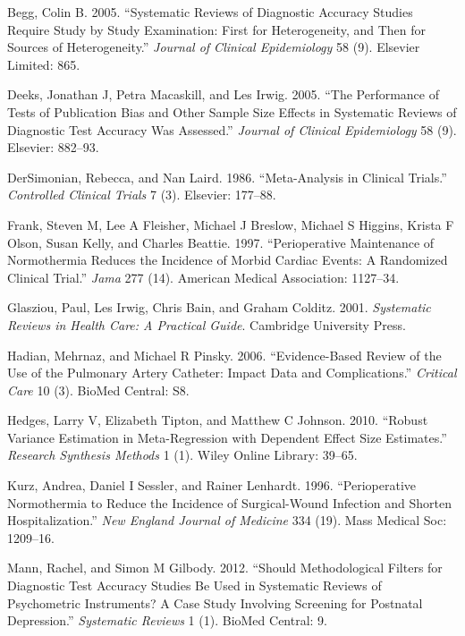 \documentclass[smallextended]{svjour3}       %
\begin{document}
\hypertarget{refs}{}
\leavevmode\hypertarget{ref-begg2005systematic}{}%
Begg, Colin B. 2005. ``Systematic Reviews of Diagnostic Accuracy Studies
Require Study by Study Examination: First for Heterogeneity, and Then
for Sources of Heterogeneity.'' \emph{Journal of Clinical Epidemiology}
58 (9). Elsevier Limited: 865.

\leavevmode\hypertarget{ref-deeks2005performance}{}%
Deeks, Jonathan J, Petra Macaskill, and Les Irwig. 2005. ``The
Performance of Tests of Publication Bias and Other Sample Size Effects
in Systematic Reviews of Diagnostic Test Accuracy Was Assessed.''
\emph{Journal of Clinical Epidemiology} 58 (9). Elsevier: 882--93.

\leavevmode\hypertarget{ref-dersimonian1986meta}{}%
DerSimonian, Rebecca, and Nan Laird. 1986. ``Meta-Analysis in Clinical
Trials.'' \emph{Controlled Clinical Trials} 7 (3). Elsevier: 177--88.

\leavevmode\hypertarget{ref-frank1997perioperative}{}%
Frank, Steven M, Lee A Fleisher, Michael J Breslow, Michael S Higgins,
Krista F Olson, Susan Kelly, and Charles Beattie. 1997. ``Perioperative
Maintenance of Normothermia Reduces the Incidence of Morbid Cardiac
Events: A Randomized Clinical Trial.'' \emph{Jama} 277 (14). American
Medical Association: 1127--34.

\leavevmode\hypertarget{ref-glasziou2001systematic}{}%
Glasziou, Paul, Les Irwig, Chris Bain, and Graham Colditz. 2001.
\emph{Systematic Reviews in Health Care: A Practical Guide}. Cambridge
University Press.

\leavevmode\hypertarget{ref-hadian2006evidence}{}%
Hadian, Mehrnaz, and Michael R Pinsky. 2006. ``Evidence-Based Review of
the Use of the Pulmonary Artery Catheter: Impact Data and
Complications.'' \emph{Critical Care} 10 (3). BioMed Central: S8.

\leavevmode\hypertarget{ref-hedges2010robust}{}%
Hedges, Larry V, Elizabeth Tipton, and Matthew C Johnson. 2010. ``Robust
Variance Estimation in Meta-Regression with Dependent Effect Size
Estimates.'' \emph{Research Synthesis Methods} 1 (1). Wiley Online
Library: 39--65.

\leavevmode\hypertarget{ref-kurz1996perioperative}{}%
Kurz, Andrea, Daniel I Sessler, and Rainer Lenhardt. 1996.
``Perioperative Normothermia to Reduce the Incidence of Surgical-Wound
Infection and Shorten Hospitalization.'' \emph{New England Journal of
Medicine} 334 (19). Mass Medical Soc: 1209--16.

\leavevmode\hypertarget{ref-mann2012should}{}%
Mann, Rachel, and Simon M Gilbody. 2012. ``Should Methodological Filters
for Diagnostic Test Accuracy Studies Be Used in Systematic Reviews of
Psychometric Instruments? A Case Study Involving Screening for Postnatal
Depression.'' \emph{Systematic Reviews} 1 (1). BioMed Central: 9.
\end{document}
